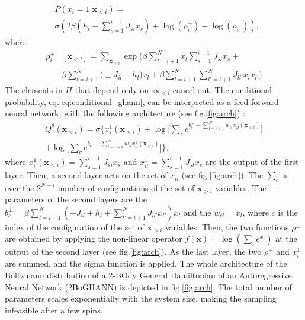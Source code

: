 \documentclass[aps,physrev,10pt,floatfix,longbibliography,nofootinbib,reprint]{revtex4-2}
\begin{document}
\begin{equation}
    \label{eq:conditional_ghann}
    \begin{split}
    & P\left(x_{i}=1|\mathbf{x}_{<i}\right) = \\
    & \sigma\left( 2 \beta \left(h_i + \sum_{s=1}^{i-1} J_{si} x_s\right) +\log(\rho_i^+) - \log(\rho_i^-)
    \right),   
    \end{split}
\end{equation}
where:
\begin{equation}
    \begin{split}
    \rho_i^{\pm}&[\mathbf{x}_{<i}]  = \sum_{\mathbf{x}_{>i}}  \exp \bigg(
    \beta\sum_{l=i+1}^{N} x_l \sum_{s=1}^{i-1} J_{sl} x_s +\\
    &\beta\sum_{l=i+1}^{N}\big( \pm J_{il}  + h_l \big) x_l 
    + \beta\sum_{l=i+1}^{N}\sum_{l'=l+1}^{N} J_{ll'} x_l x_{l'} \bigg)
\end{split}
\label{eq:rho_ghann}
\end{equation}
The elements in $H$ that depend only on s$\mathbf{x}_{<i}$ cancel out.
The conditional probability, eq.\ref{eq:conditional_ghann}, can be interpreted as a feed-forward neural network, with the following architecture (see fig.\ref{fig:arch}) :
\begin{multline}
     Q^{\theta}\left(\mathbf{x}_{<i}\right) = 
     \sigma \bigg\{ x_i^1(\mathbf{x}_{<i})+\log\big[ \sum_{c} e^{b_c^+ + \sum_{l=i+1}^{N} w_{cl} x_{il}^1(\mathbf{x}_{<i})}\big] \\
     +\log\big[ \sum_{c} e^{b_c^- + \sum_{l=i+1}^{N} w_{cl} x_{il}^1(\mathbf{x}_{<i})}\big] \bigg\},
\end{multline}
where $x_i^1(\mathbf{x}_{<i})=\sum_{s=1}^{i-1} J_{si} x_s$ and $x_{il}^1=\sum_{s=1}^{i-1} J_{sl} x_s$ are the output of the first layer. 
Then, a second layer acts on the set of $x_{il}^1$ (see fig.\ref{fig:arch}). The $\sum_{c}$ is over the $2^{N-i}$ number of configurations of the set of $\mathbf{x}_{>i}$ variables. 
The parameters of the second layers are the $b_c^{\pm} = \beta\sum_{l=i+1}^N (\pm J_{il} + h_l + \sum_{l'=l+1}^N J_{ll'}x_{l'}) x_l $ and the $w_{cl}=x_l$, where $c$ is the index of the configuration of the set of $\mathbf{x}_{>i}$ variables. Then, the two functions $\rho^{\pm}$ are obtained by applying the non-linear operator $f(\mathbf{x}) = \log(\sum_i e^{x_i})$ at the output of the second layer (see fig.\ref{fig:arch}). 
As the last layer, the two $\rho^{\pm}$ and $x_i^1$ are summed, and the sigma function is applied. The whole architecture of the Boltzmann distribution of a 2-BOdy General Hamiltonian of an Autoregressive Neural Network (2BoGHANN) is depicted in fig.\ref{fig:arch}. The total number of parameters scales exponentially with the system size, making the sampling infeasible after a few spins.
\end{document}
